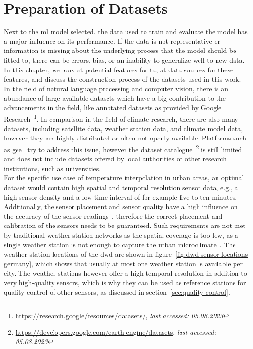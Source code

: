 \chapter{Preparation of Datasets}
\label{chap:preparations data sets}

Next to the \gls{ml} model selected, the data used to train and evaluate the model has a major influence on its performance. If the data is not representative or information is missing about the underlying process that the model should be fitted to, there can be errors, bias, or an inability to generalize well to new data. In this chapter, we look at potential features for \gls{ta}, at data sources for these features, and discuss the construction process of the datasets used in this work.\\
In the field of natural language processing and computer vision, there is an abundance of large available datasets which have a big contribution to the advancements in the field, like annotated datasets as provided by Google Research~\footnote{\url{https://research.google/resources/datasets/}, \textit{last accessed: 05.08.2023}}. In comparison in the field of climate research, there are also many datasets, including satellite data, weather station data, and climate model data, however they are highly distributed or often not openly available. Platforms such as \gls{gee}~\cite{gorelick2017google} try to address this issue, however the dataset catalogue~\footnote{\url{https://developers.google.com/earth-engine/datasets}, \textit{last accessed: 05.08.2023}} is still limited and does not include datasets offered by local authorities or other research institutions, such as universities.\\
For the specific use case of temperature interpolation in urban areas, an optimal dataset would contain high spatial and temporal resolution sensor data, e.g., a high sensor density and a low time interval of for example five to ten minutes. Additionally, the sensor placement and sensor quality have a high influence on the accuracy of the sensor readings~\cite{oke2006guideline}, therefore the correct placement and calibration of the sensors needs to be guaranteed. Such requirements are not met by traditional weather station networks as the spatial coverage is too low, as a single weather station is not enough to capture the urban microclimate~\cite{oke2017urban}. The weather station locations of the \gls{dwd} are shown in figure~\ref{fig:dwd sensor locations germany}, which shows that usually at most one weather station is available per city. The weather stations however offer a high temporal resolution in addition to very high-quality sensors, which is why they can be used as reference stations for quality control of other sensors, as discussed in section~\ref{sec:quality control}.\\
